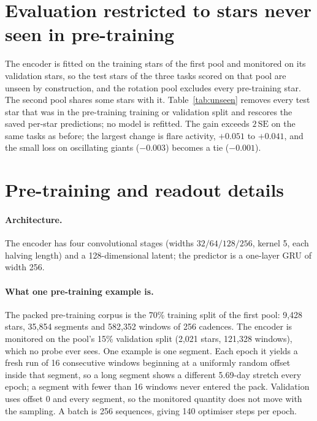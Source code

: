 \documentclass{article}
\begin{document}
\section{Evaluation restricted to stars never seen in pre-training}
\label{app:unseen}

The encoder is fitted on the training stars of the first pool and monitored on its validation stars,
so the test stars of
the three tasks scored on that pool are unseen by construction, and the rotation pool excludes every
pre-training star. The second pool shares some stars with
it. Table~\ref{tab:unseen} removes every test star that was in the pre-training training or validation
split and rescores the saved per-star predictions; no model is refitted. The gain exceeds
$2\,\mathrm{SE}$ on the same tasks as before; the largest change is flare activity, $+0.051$ to
$+0.041$, and the small loss on oscillating giants ($-0.003$) becomes a tie ($-0.001$).

\begin{table}[H]
\caption{The fusion gain (features\,$\oplus\,\mu$ minus features, linear readout) on all test stars and
on the test stars never seen in pre-training. Bold: beyond $2\,\mathrm{SE}$ over six encoder seeds.}
\label{tab:unseen}
\centering
\scriptsize

\end{table}

\section{Pre-training and readout details}
\label{app:training}

\paragraph{Architecture.} The encoder has four convolutional stages (widths $32/64/128/256$, kernel 5,
each halving length) and a 128-dimensional latent; the predictor is a one-layer GRU of width 256.

\paragraph{What one pre-training example is.} The packed pre-training corpus is the 70\% training
split of the first pool: 9{,}428 stars, 35{,}854 segments and 582{,}352 windows of 256 cadences. The
encoder is monitored on the pool's 15\% validation split (2{,}021 stars, 121{,}328 windows), which no
probe ever sees. One example is one segment. Each epoch it yields a fresh run of 16 consecutive
windows beginning at a uniformly random offset inside that segment, so a long segment shows a
different 5.69-day stretch every epoch; a segment with fewer than 16 windows never entered the pack.
Validation uses offset 0 and every segment, so the monitored quantity does not move with the
sampling. A batch is 256 sequences, giving 140 optimiser steps per epoch.
\end{document}
